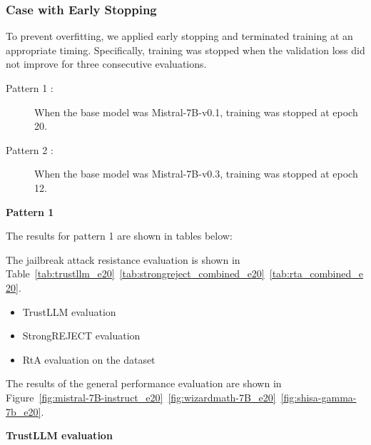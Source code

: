 \documentclass[conference,compsoc]{IEEEtran}
\begin{document}
\subsubsection{Case with Early Stopping}
\leavevmode\par
To prevent overfitting, we applied early stopping and terminated training at an appropriate timing. Specifically, training was stopped when the validation loss did not improve for three consecutive evaluations.

\begin{description}
    \item[Pattern 1 :] When the base model was Mistral-7B-v0.1, training was stopped at epoch 20. 
    \item[Pattern 2 :] When the base model was Mistral-7B-v0.3, training was stopped at epoch 12.
\end{description}
\bigskip
\textbf{Pattern 1}

The results for pattern 1 are shown in tables below: 

The jailbreak attack resistance evaluation is shown in Table~\ref{tab:trustllm_e20}~\ref{tab:strongreject_combined_e20}~\ref{tab:rta_combined_e20}.  
\begin{itemize}
    \item TrustLLM evaluation  
    \item StrongREJECT evaluation  
    \item RtA evaluation on the dataset  
\end{itemize}
The results of the general performance evaluation are shown in Figure~\ref{fig:mistral-7B-instruct_e20}~\ref{fig:wizardmath-7B_e20}~\ref{fig:shisa-gamma-7b_e20}.  

\leavevmode\par
\textbf{TrustLLM evaluation}

\end{document}
